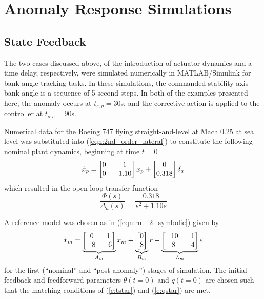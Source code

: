 \chapter{Anomaly Response Simulations}  \label{sec:numerical}
\section{State Feedback}
The two cases discussed above, of the introduction of actuator dynamics and a time delay, respectively, were simulated numerically in MATLAB/Simulink for bank angle tracking tasks. In these simulations, the commanded stability axis bank angle is a sequence of 5-second steps. In both of the examples presented here, the anomaly occurs at $t_{s,p} = 30$s, and the corrective action is applied to the controller at $t_{s,c} = 90$s.

Numerical data for the Boeing 747 flying straight-and-level at Mach 0.25 at sea level\cite{heffley1972aircraft} was substituted into (\ref{eqn:2nd_order_lateral}) to constitute the following nominal plant dynamics, beginning at time $t = 0$
\begin{equation}
		\dot{x}_p = \begin{bmatrix}
			0 & \hfil 1 \\ 0 & -1.10
		\end{bmatrix} x_p + \begin{bmatrix}
			0 \\ 0.318
		\end{bmatrix} \delta_a
\end{equation} \noindent which resulted in the open-loop transfer function 
\begin{equation}
		\frac{\Phi(s)}{\Delta_a(s)} = \frac{0.318}{s^2 + 1.10s}
\end{equation}

A reference model was chosen as in (\ref{eqn:rm_2_symbolic}) given by
\begin{equation}
	\dot{x}_m = \underbrace{\begin{bmatrix}
		\hfil 0 & \hfil 1\\ -8 & -6
	\end{bmatrix}}_{A_m} x_m + \underbrace{\begin{bmatrix}
		0 \\ 8
	\end{bmatrix}}_{B_m} r - \underbrace{\begin{bmatrix}
		\hfil -10 & \hfil -1 \\ \hfil 8 & \hfil -4
	\end{bmatrix}}_{L_m} e
	\label{eqn:rm_2}
\end{equation}
\noindent for the first (``nominal'' and ``post-anomaly'') stages of simulation. The initial feedback and feedforward parameters $\theta(t=0)$ and $q(t=0)$ are chosen such that the matching conditions of (\ref{e:tstar}) and (\ref{e:qstar}) are met.

